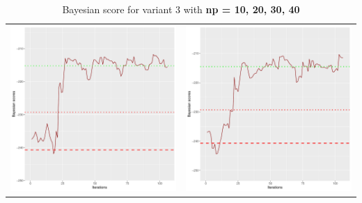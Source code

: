 \documentclass[]{scrartcl}
\begin{document}
\begin{table}[h!]
\begin{tabular}{cc}
\includegraphics[scale = 0.4]{./figs/asia/v3/30/bayBoundsEvolution-107.pdf} & 
\includegraphics[scale = 0.4]{./figs/asia/v3/40/bayBoundsEvolution-107.pdf} \\
\end{tabular}
\caption{Bayesian score for variant 3 with \textbf{np =  10, 20, 30, 40}}
\end{table}
\end{document}
